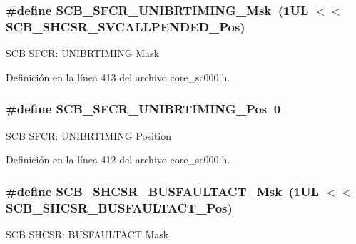 \subsubsection[{\texorpdfstring{S\+C\+B\+\_\+\+S\+F\+C\+R\+\_\+\+U\+N\+I\+B\+R\+T\+I\+M\+I\+N\+G\+\_\+\+Msk}{SCB_SFCR_UNIBRTIMING_Msk}}]{\setlength{\rightskip}{0pt plus 5cm}\#define S\+C\+B\+\_\+\+S\+F\+C\+R\+\_\+\+U\+N\+I\+B\+R\+T\+I\+M\+I\+N\+G\+\_\+\+Msk~(1\+U\+L $<$$<$ S\+C\+B\+\_\+\+S\+H\+C\+S\+R\+\_\+\+S\+V\+C\+A\+L\+L\+P\+E\+N\+D\+E\+D\+\_\+\+Pos)}\hypertarget{group___c_m_s_i_s___s_c_b_ga396f038c53d08de0020bdbe4f8cd5bea}{}\label{group___c_m_s_i_s___s_c_b_ga396f038c53d08de0020bdbe4f8cd5bea}
S\+CB S\+F\+CR\+: U\+N\+I\+B\+R\+T\+I\+M\+I\+NG Mask 

Definición en la línea 413 del archivo core\+\_\+sc000.\+h.

\subsubsection[{\texorpdfstring{S\+C\+B\+\_\+\+S\+F\+C\+R\+\_\+\+U\+N\+I\+B\+R\+T\+I\+M\+I\+N\+G\+\_\+\+Pos}{SCB_SFCR_UNIBRTIMING_Pos}}]{\setlength{\rightskip}{0pt plus 5cm}\#define S\+C\+B\+\_\+\+S\+F\+C\+R\+\_\+\+U\+N\+I\+B\+R\+T\+I\+M\+I\+N\+G\+\_\+\+Pos~0}\hypertarget{group___c_m_s_i_s___s_c_b_ga3b905441d170f29da1d5f6f8ba8d797d}{}\label{group___c_m_s_i_s___s_c_b_ga3b905441d170f29da1d5f6f8ba8d797d}
S\+CB S\+F\+CR\+: U\+N\+I\+B\+R\+T\+I\+M\+I\+NG Position 

Definición en la línea 412 del archivo core\+\_\+sc000.\+h.

\subsubsection[{\texorpdfstring{S\+C\+B\+\_\+\+S\+H\+C\+S\+R\+\_\+\+B\+U\+S\+F\+A\+U\+L\+T\+A\+C\+T\+\_\+\+Msk}{SCB_SHCSR_BUSFAULTACT_Msk}}]{\setlength{\rightskip}{0pt plus 5cm}\#define S\+C\+B\+\_\+\+S\+H\+C\+S\+R\+\_\+\+B\+U\+S\+F\+A\+U\+L\+T\+A\+C\+T\+\_\+\+Msk~(1\+U\+L $<$$<$ S\+C\+B\+\_\+\+S\+H\+C\+S\+R\+\_\+\+B\+U\+S\+F\+A\+U\+L\+T\+A\+C\+T\+\_\+\+Pos)}\hypertarget{group___c_m_s_i_s___s_c_b_ga9d7a8b1054b655ad08d85c3c535d4f73}{}\label{group___c_m_s_i_s___s_c_b_ga9d7a8b1054b655ad08d85c3c535d4f73}
S\+CB S\+H\+C\+SR\+: B\+U\+S\+F\+A\+U\+L\+T\+A\+CT Mask 

